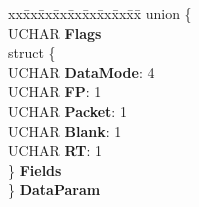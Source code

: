 \begin{DoxyCompactItemize}
\begin{tabbing}
\end{tabbing}\item 
\mbox{\label{struct___t_r_a_c_k___i_n_f_o___b_l_o_c_k___u_s_e_r___o_u_t_af605a43d3c4378eb64c5e29534b86535}} 
\begin{tabbing}
xx\=xx\=xx\=xx\=xx\=xx\=xx\=xx\=xx\=\kill
union \{\\
\>UCHAR {\bfseries Flags}\\
\>struct \{\\
\>\>UCHAR {\bfseries DataMode}: 4\\
\>\>UCHAR {\bfseries FP}: 1\\
\>\>UCHAR {\bfseries Packet}: 1\\
\>\>UCHAR {\bfseries Blank}: 1\\
\>\>UCHAR {\bfseries RT}: 1\\
\>\} {\bfseries Fields}\\
\} {\bfseries DataParam}\\


\end{tabbing}
\end{DoxyCompactItemize}
